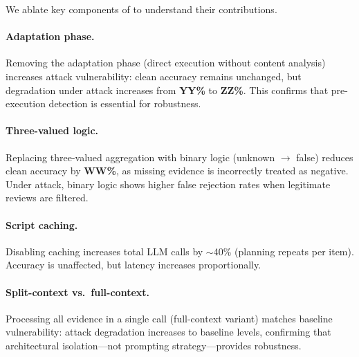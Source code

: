 We ablate key components of \method to understand their contributions.

\paragraph{Adaptation phase.}
Removing the adaptation phase (direct execution without content analysis) increases attack vulnerability:
clean accuracy remains unchanged, but degradation under attack increases from \textbf{YY\%} to \textbf{ZZ\%}.
This confirms that pre-execution detection is essential for robustness.

\paragraph{Three-valued logic.}
Replacing three-valued aggregation with binary logic (unknown $\rightarrow$ false) reduces clean accuracy by \textbf{WW\%}, as missing evidence is incorrectly treated as negative.
Under attack, binary logic shows higher false rejection rates when legitimate reviews are filtered.

\paragraph{Script caching.}
Disabling caching increases total LLM calls by $\sim$40\% (planning repeats per item).
Accuracy is unaffected, but latency increases proportionally.

\paragraph{Split-context vs.\ full-context.}
Processing all evidence in a single call (full-context variant) matches baseline vulnerability: attack degradation increases to baseline levels, confirming that architectural isolation---not prompting strategy---provides robustness.

